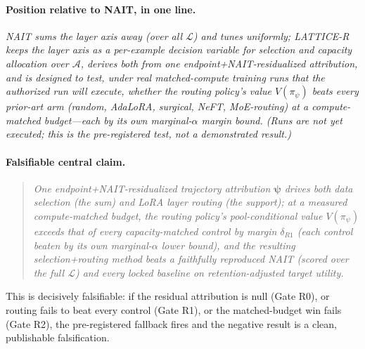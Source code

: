 \documentclass[11pt]{article}
\theoremstyle{definition}
\newcommand{\Aset}{\mathcal{A}}
\newcommand{\Lset}{\mathcal{L}}
\newcommand{\psivec}{\bm{\psi}}
\newcommand{\Vpol}{V}
\begin{document}
\paragraph{Position relative to NAIT, in one line.}
\emph{NAIT sums the layer axis away (over all $\Lset$) and tunes uniformly; LATTICE-R
keeps the layer axis as a per-example decision variable for selection \emph{and}
capacity allocation over $\Aset$, derives both from one endpoint+NAIT-residualized
attribution, and is \emph{designed to test}, under real matched-compute training runs
that the authorized run will execute, whether the routing policy's value
$\Vpol(\pi_\psi)$ beats every prior-art arm (random, AdaLoRA, surgical, NeFT, MoE-routing)
at a compute-matched budget---each by its own marginal-$\alpha$ margin bound. (Runs are
not yet executed; this is the pre-registered test, not a demonstrated result.)}

\paragraph{Falsifiable central claim.}
\begin{quote}\itshape
One endpoint+NAIT-residualized trajectory attribution $\psivec$ drives both data
selection (the sum) and LoRA layer routing (the support); at a measured compute-matched
budget, the routing policy's pool-conditional value $\Vpol(\pi_\psi)$ exceeds that of
every capacity-matched control by margin $\delta_{R1}$ (each control beaten by its own
marginal-$\alpha$ lower bound), and the resulting selection+routing method beats a
faithfully reproduced NAIT (scored over the full $\Lset$) and every locked baseline on
retention-adjusted target utility.
\end{quote}
This is decisively falsifiable: if the residual attribution is null (Gate R0), or
routing fails to beat every control (Gate R1), or the matched-budget win fails
(Gate R2), the pre-registered fallback fires and the negative result is a clean,
publishable falsification.
\end{document}
